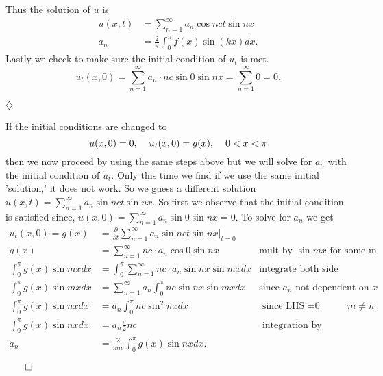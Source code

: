 \documentclass{article}
\begin{document}
Thus the solution of \(u\) is 
\begin{align*}
u(x,t) &= \sum_{n=1}^{\infty}  a_n \cos nct \sin nx \\
a_n &= \frac{2}{\pi}\int_0^\pi f(x) \sin(kx) dx.
\end{align*}
Lastly we check to make sure the initial condition of \(u_t\) is met. 
\[
u_t(x,0) =  \sum_{n=1}^{\infty}  a_n \cdot nc \sin0 \sin nx  =\sum_{n=1}^{\infty}0=0.
\]
\begin{flushright}
\( \diamondsuit \)
\end{flushright}
If the initial conditions are changed to 
\[
u(x,0)=0, \hspace{4mm} u_t(x,0)=g(x), \hspace{4mm}0 <x<\pi
\]
then we now proceed by using the same steps above but we will solve for \(a_n\) with the initial condition of \(u_t\). Only this time we find if we use the same initial 'solution,' it does not work. So we guess a different solution \(u(x,t) = \sum_{n=1}^{\infty}  a_n \sin nct \sin nx\). So first we observe that the initial condition is satisfied since, \(u(x,0) =  \sum_{n=1}^{\infty}  a_n \sin 0 \sin nx = 0\). To solve for \(a_n\) we get
\begin{align*}
u_t(x,0) = g(x) &= \frac{\partial}{\partial t}  \sum_{n=1}^{\infty}  a_n \sin nct \sin nx \Big|_{t=0}  \\
g(x)&= \sum_{n=1}^{\infty} nc \cdot a_n \cos 0 \sin nx         &       \text{mult by \(\sin mx\) for some m}    &   \\
\int_0^{\pi} g(x)\sin mx dx &= \int_0^{\pi} \sum_{n=1}^{\infty} nc \cdot a_n  \sin nx \sin mx   dx   & \text{integrate both side w.r.t. x}         &   \\
\int_0^{\pi} g(x) \sin mx dx &= \sum_{n=1}^{\infty}  a_n\int_0^{\pi}  nc \sin nx \sin mx  dx       &   \text{since } a_n \text{ not dependent on } x  &   \\
\int_0^{\pi} g(x) \sin nx dx &=  a_n\int_0^{\pi}  nc \sin^2 nx   dx  &          \text{ since LHS =0 whenever } m\neq n&   \\
\int_0^{\pi} g(x) \sin nx dx&=  a_n \frac{\pi}{2} nc  &        \text{ integration by Mathematica}   &   \\
a_n &= \frac{2}{\pi n c }\int_0^{\pi} g(x) \sin nx dx .      &          &  
\end{align*}
\begin{flushright}
\( \qed\)
\end{flushright}
\end{document}
